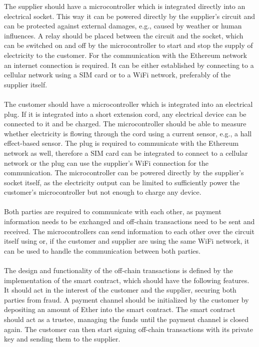The supplier should have a microcontroller which is integrated directly into an electrical socket.
This way it can be powered directly by the supplier's circuit and can be protected against external damages, e.g., caused by weather or human influences.
A relay should be placed between the circuit and the socket, which can be switched on and off by the microcontroller to start and stop the supply of electricity to the customer.
For the communication with the Ethereum network an internet connection is required.
It can be either established by connecting to a cellular network using a SIM card or to a WiFi network, preferably of the supplier itself.
\\\\
The customer should have a microcontroller which is integrated into an electrical plug.
If it is integrated into a short extension cord, any electrical device can be connected to it and be charged.
The microcontroller should be able to measure whether electricity is flowing through the cord using a current sensor, e.g., a hall effect-based sensor.
The plug is required to communicate with the Ethereum network as well, therefore a SIM card can be integrated to connect to a cellular network or the plug can use the supplier's WiFi connection for the communication.
The microcontroller can be powered directly by the supplier's socket itself, as the electricity output can be limited to sufficiently power the customer's microcontroller but not enough to charge any device.
\\\\
Both parties are required to communicate with each other, as payment information needs to be exchanged and off-chain transactions need to be sent and received.
The microcontrollers can send information to each other over the circuit itself using  or, if the customer and supplier are using the same WiFi network, it can be used to handle the communication between both parties.
\\\\
The design and functionality of the off-chain transactions is defined by the implementation of the smart contract, which should have the following features.
It should act in the interest of the customer and the supplier, securing both parties from fraud.
A payment channel should be initialized by the customer by depositing an amount of Ether into the smart contract.
The smart contract should act as a trustee, managing the funds until the payment channel is closed again.
The customer can then start signing off-chain transactions with its private key and sending them to the supplier.
